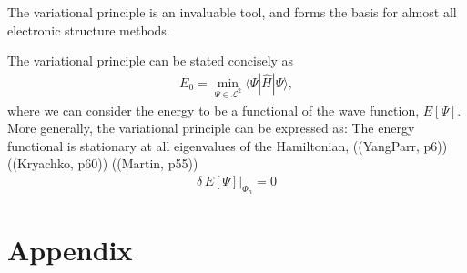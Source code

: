 \documentclass[a4paper]{article}
\begin{document}
The variational principle is an invaluable tool, and forms the basis for almost all electronic structure methods. 

The variational principle can be stated concisely as 
\begin{align}
E_0 = \min_{\Psi\in \mathcal{L}^2}\big\langle \Psi | \hat H | \Psi \big\rangle,
\end{align}
where we can consider the energy to be a functional of the wave function, $E[\Psi]$. More generally, the variational principle can be expressed as: The energy functional is stationary at all eigenvalues of the Hamiltonian, ((YangParr, p6)) ((Kryachko, p60)) ((Martin, p55))
\begin{align}
\delta \, E[\Psi]\Big|_{\Phi_n}=0
\end{align}































\section{Appendix}
\end{document}

